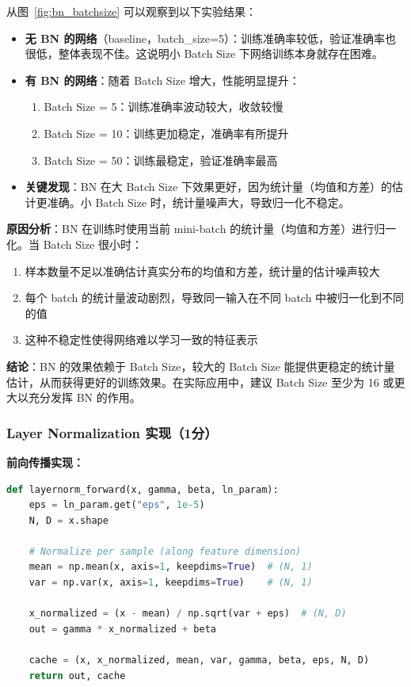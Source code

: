 \documentclass[a4paper]{article}
\begin{document}
从图~\ref{fig:bn_batchsize} 可以观察到以下实验结果：
\begin{itemize}
    \item \textbf{无 BN 的网络}（baseline，batch\_size=5）：训练准确率较低，验证准确率也很低，整体表现不佳。这说明小 Batch Size 下网络训练本身就存在困难。

    \item \textbf{有 BN 的网络}：随着 Batch Size 增大，性能明显提升：
    \begin{enumerate}
        \item Batch Size = 5：训练准确率波动较大，收敛较慢
        \item Batch Size = 10：训练更加稳定，准确率有所提升
        \item Batch Size = 50：训练最稳定，验证准确率最高
    \end{enumerate}

    \item \textbf{关键发现}：BN 在大 Batch Size 下效果更好，因为统计量（均值和方差）的估计更准确。小 Batch Size 时，统计量噪声大，导致归一化不稳定。
\end{itemize}

\textbf{原因分析}：BN 在训练时使用当前 mini-batch 的统计量（均值和方差）进行归一化。当 Batch Size 很小时：
\begin{enumerate}
    \item 样本数量不足以准确估计真实分布的均值和方差，统计量的估计噪声较大
    \item 每个 batch 的统计量波动剧烈，导致同一输入在不同 batch 中被归一化到不同的值
    \item 这种不稳定性使得网络难以学习一致的特征表示
\end{enumerate}

\textbf{结论}：BN 的效果依赖于 Batch Size，较大的 Batch Size 能提供更稳定的统计量估计，从而获得更好的训练效果。在实际应用中，建议 Batch Size 至少为 16 或更大以充分发挥 BN 的作用。

\subsubsection{Layer Normalization 实现（1分）}

\textbf{前向传播实现：}

\begin{lstlisting}[language=Python]
def layernorm_forward(x, gamma, beta, ln_param):
    eps = ln_param.get("eps", 1e-5)
    N, D = x.shape
    
    # Normalize per sample (along feature dimension)
    mean = np.mean(x, axis=1, keepdims=True)  # (N, 1)
    var = np.var(x, axis=1, keepdims=True)    # (N, 1)
    
    x_normalized = (x - mean) / np.sqrt(var + eps)  # (N, D)
    out = gamma * x_normalized + beta
    
    cache = (x, x_normalized, mean, var, gamma, beta, eps, N, D)
    return out, cache
\end{lstlisting}
\end{document}
